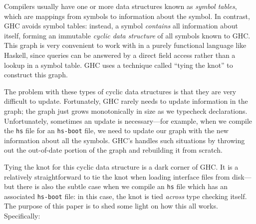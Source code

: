 Compilers usually have one or more data structures known as
\emph{symbol tables}, which are mappings from symbols to information
about the symbol.  In contrast, GHC avoids symbol tables:  instead, a
symbol \emph{contains} all information about itself, forming an
immutable \emph{cyclic data structure} of all symbols
known to GHC\@.  This graph is very convenient to work
with in a purely functional language like Haskell, since queries can
be answered by a direct field access rather than a lookup in
a symbol table.  GHC uses a technique called ``tying the knot''
to construct this graph.

The problem with these types of cyclic data structures is that
they are very difficult to update.  Fortunately, GHC rarely
needs to update information in the graph; the graph just grows
monotonically in size as we typecheck declarations.
Unfortunately, sometimes an update is necessary---for example, when
we compile the \verb|hs| file for an \verb|hs-boot| file, we
need to update our graph with the new information about all the
symbols.  GHC's handles such situations by throwing out the out-of-date
portion of the graph and rebuilding it from scratch.

Tying the knot for this cyclic data structure is a dark corner of GHC\@.
It is a relatively straightforward to tie the knot when loading
interface files from disk---but there is also the subtle case when we
compile an \verb|hs| file which has an associated \verb|hs-boot| file:
in this case, the knot is tied \emph{across} type checking itself.
The purpose of this paper is to shed some light on how this all works.
Specifically:

